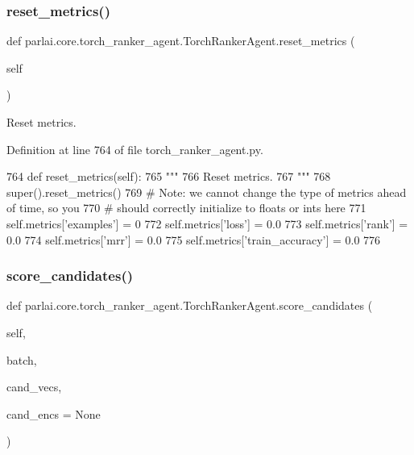 \subsubsection{\texorpdfstring{reset\+\_\+metrics()}{reset\_metrics()}}
{\footnotesize\ttfamily def parlai.\+core.\+torch\+\_\+ranker\+\_\+agent.\+Torch\+Ranker\+Agent.\+reset\+\_\+metrics (\begin{DoxyParamCaption}\item[{}]{self }\end{DoxyParamCaption})}

\begin{DoxyVerb}Reset metrics.
\end{DoxyVerb}
 

Definition at line 764 of file torch\+\_\+ranker\+\_\+agent.\+py.


\begin{DoxyCode}
764     \textcolor{keyword}{def }reset\_metrics(self):
765         \textcolor{stringliteral}{"""}
766 \textcolor{stringliteral}{        Reset metrics.}
767 \textcolor{stringliteral}{        """}
768         super().reset\_metrics()
769         \textcolor{comment}{# Note: we cannot change the type of metrics ahead of time, so you}
770         \textcolor{comment}{# should correctly initialize to floats or ints here}
771         self.metrics[\textcolor{stringliteral}{'examples'}] = 0
772         self.metrics[\textcolor{stringliteral}{'loss'}] = 0.0
773         self.metrics[\textcolor{stringliteral}{'rank'}] = 0.0
774         self.metrics[\textcolor{stringliteral}{'mrr'}] = 0.0
775         self.metrics[\textcolor{stringliteral}{'train\_accuracy'}] = 0.0
776 
\end{DoxyCode}
\mbox{\label{classparlai_1_1core_1_1torch__ranker__agent_1_1TorchRankerAgent_a65d5726a4e2098212298bc2cdf13e70f}} 
\subsubsection{\texorpdfstring{score\+\_\+candidates()}{score\_candidates()}}
{\footnotesize\ttfamily def parlai.\+core.\+torch\+\_\+ranker\+\_\+agent.\+Torch\+Ranker\+Agent.\+score\+\_\+candidates (\begin{DoxyParamCaption}\item[{}]{self,  }\item[{}]{batch,  }\item[{}]{cand\+\_\+vecs,  }\item[{}]{cand\+\_\+encs = {\ttfamily None} }\end{DoxyParamCaption})}

